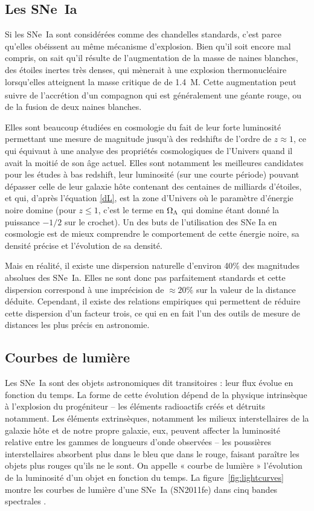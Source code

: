 \documentclass[a4paper, 12pt, svgnames]{article}
\begin{document}
\subsection{Les SNe~Ia}\label{ssec:sneia}
Si les SNe~Ia sont considérées comme des chandelles standards, c'est parce
qu'elles obéissent au même mécanisme d'explosion. Bien qu'il soit encore mal
compris, on sait qu'il résulte de l'augmentation de la masse de naines
blanches, des étoiles inertes très denses, qui mènerait à une explosion
thermonucléaire lorsqu'elles atteignent la masse critique de 
de \SI{1.4}{M_\odot}. Cette augmentation peut suivre de l'accrétion d'un
compagnon qui est généralement une géante rouge, ou de la fusion de deux naines
blanches. \bigbreak

Elles sont beaucoup étudiées en cosmologie du fait de leur forte luminosité
permettant une mesure de magnitude jusqu'à des redshifts de l'ordre de $z
\approx 1$, ce qui équivaut à une analyse des propriétés cosmologiques de
l'Univers quand il avait la moitié de son âge actuel. Elles sont notamment les
meilleures candidates pour les études à bas redshift, leur luminosité (sur une
courte période) pouvant dépasser celle de leur galaxie hôte contenant des
centaines de milliards d'étoiles,  et qui, d'après l'équation \ref{dL}, est la
zone d'Univers où le paramètre d'énergie noire domine (pour $z \leq 1$, c'est le
terme en $\Omega_\Lambda$ qui domine étant donné la puissance $-1/2$ sur le crochet). Un
des buts de l'utilisation des SNe Ia en cosmologie est de mieux comprendre le
comportement de cette énergie noire, sa densité précise et l'évolution de sa
densité. \bigbreak

Mais en réalité, il existe une dispersion naturelle d'environ 40\% des
magnitudes absolues des SNe~Ia. Elles ne sont donc pas parfaitement standards et
cette dispersion correspond à une imprécision de $\approx 20\%$ sur la valeur de
la distance déduite. Cependant, il existe des relations empiriques qui
permettent de réduire cette dispersion d'un facteur trois, ce qui en en fait
l'un des outils de mesure de distances les plus précis en astronomie.

\subsection{Courbes de lumière}\label{ssec:lc}

Les SNe~Ia sont des objets astronomiques dit transitoires : leur flux évolue en
fonction du temps. La forme de cette évolution dépend de la physique intrinsèque
à l'explosion du progéniteur -- les éléments radioactifs créés et détruits
notamment. Les éléments extrinsèques, notamment les milieux interstellaires de
la galaxie hôte et de notre propre galaxie, eux, peuvent affecter la luminosité
relative entre les gammes de longueurs d'onde observées -- les poussières
interstellaires absorbent plus dans le bleu que dans le rouge, faisant paraître
les objets plus rouges qu'ils ne le sont. On appelle « courbe de lumière »
l'évolution de la luminosité d'un objet en fonction du temps. La
figure~\ref{fig:lightcurves} montre les courbes de lumière d'une SNe~Ia
(SN2011fe) dans cinq bandes spectrales \cite{pereira_spectrophotometric_2013}.
\end{document}
